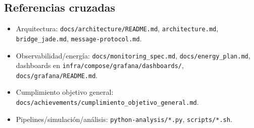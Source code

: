 \subsection*{Referencias cruzadas}
\begin{itemize}
  \item Arquitectura: \texttt{docs/architecture/README.md}, \texttt{architecture.md}, \texttt{bridge\_jade.md}, \texttt{message-protocol.md}.
  \item Observabilidad/energía: \texttt{docs/monitoring\_spec.md}, \texttt{docs/energy\_plan.md}, dashboards en \texttt{infra/compose/grafana/dashboards/}, \texttt{docs/grafana/README.md}.
  \item Cumplimiento objetivo general: \texttt{docs/achievements/cumplimiento\_objetivo\_general.md}.
  \item Pipelines/simulación/análisis: \texttt{python-analysis/*.py}, \texttt{scripts/*.sh}.
\end{itemize}
